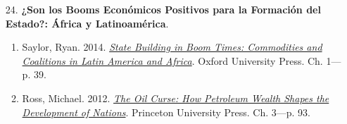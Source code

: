 \documentclass[letterpaper]{article}
\begin{document}
\begin{enumerate}
\begin{enumerate}
			\item[24.] {\bf ¿Son los Booms Econ\'omicos Positivos para la Formaci\'on del Estado?: \'Africa y Latinoam\'erica}.
				\begin{enumerate}
					\item Saylor, Ryan. 2014. \href{https://github.com/hbahamonde/Ciencia_Politica_I/raw/master/Readings/Saylor.pdf}{\emph{State Building in Boom Times: Commodities and Coalitions in Latin America and Africa}}. Oxford University Press. Ch. 1---p. 39.
					
					\item Ross, Michael. 2012. \href{https://github.com/hbahamonde/Ciencia_Politica_I/raw/master/Readings/Ross_2012.epub}{\emph{The Oil Curse: How Petroleum Wealth Shapes the Development of Nations}}. Princeton University Press. Ch. 3---p. 93.
				\end{enumerate}
		

		\end{enumerate}

{\huge{\color{blue}\Pointinghand}} {\large{}}

\end{enumerate}



			


			



\newpage
{}
\setcounter{page}{1}
\printbibliography
\end{document}
